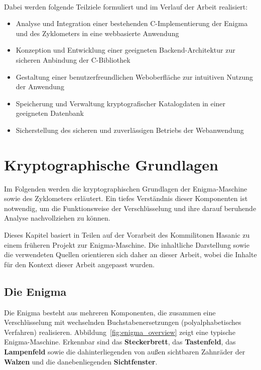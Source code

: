 \documentclass[12pt, ngerman, a4paper, numbers=noenddot]{article}
\begin{document}
\ \\
Dabei werden folgende Teilziele formuliert und im Verlauf der Arbeit realisiert:

\begin{itemize}
	\item Analyse und Integration einer bestehenden C-Implementierung der Enigma und des Zyklometers in eine webbasierte Anwendung
	\item Konzeption und Entwicklung einer geeigneten Backend-Architektur zur sicheren Anbindung der C-Bibliothek
	\item Gestaltung einer benutzerfreundlichen Weboberfläche zur intuitiven Nutzung der Anwendung
	\item Speicherung und Verwaltung kryptografischer Katalogdaten in einer geeigneten Datenbank
	\item Sicherstellung des sicheren und zuverlässigen Betriebs der Webanwendung
\end{itemize}





\newpage
\section{Kryptographische Grundlagen}

Im Folgenden werden die kryptographischen Grundlagen der Enigma-Maschine sowie des Zyklometers erläutert. Ein tiefes Verständnis dieser Komponenten ist notwendig, um die Funktionsweise der Verschlüsselung und ihre darauf beruhende Analyse nachvollziehen zu können.

Dieses Kapitel basiert in Teilen auf der Vorarbeit des Kommilitonen Hasanic zu einem früheren Projekt zur Enigma-Maschine. Die inhaltliche Darstellung sowie die verwendeten Quellen orientieren sich daher an dieser Arbeit, wobei die Inhalte für den Kontext dieser Arbeit angepasst wurden.


\subsection{Die Enigma}


Die Enigma besteht aus mehreren Komponenten, die zusammen eine Verschlüsselung mit wechselnden Buchstabenersetzungen (polyalphabetisches Verfahren) realisieren. Abbildung~\ref{fig:enigma_overview} zeigt eine typische Enigma-Maschine. Erkennbar sind das \textbf{Steckerbrett}, das \textbf{Tastenfeld}, das \textbf{Lampenfeld} sowie die dahinterliegenden von außen sichtbaren Zahnräder der \textbf{Walzen} und die danebenliegenden \textbf{Sichtfenster}.
\end{document}
